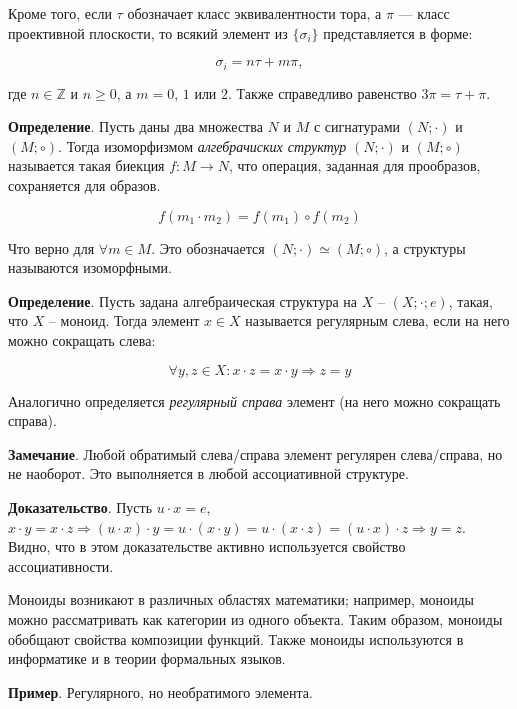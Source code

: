 \documentclass[a4paper]{book}
\begin{document}
Кроме того, если $\tau$ обозначает класс эквивалентности тора, а $\pi$ — класс проективной плоскости, то всякий элемент из $\{\sigma_i\}$ представляется в форме: 

\begin{equation}
	\sigma_i = n\tau + m\pi,
\end{equation}

где $n\in \mathbb{Z}$ и $n\geq 0$, а $m =0$, $1$ или $2$. Также справедливо равенство $3\pi = \tau + \pi$. 


\textbf{Определение}. Пусть даны два множества $N$ и $M$ с сигнатурами $(N;\cdot)$ и $(M;\circ)$. Тогда изоморфизмом \textit{алгебрачиских структур} $(N;\cdot)$ и $(M;\circ)$ называется такая биекция $f:M\rightarrow N$, что операция, заданная для прообразов, сохраняется для образов. 


\begin{equation}
	f(m_1\cdot m_2) = f(m_1)\circ f(m_2)
\end{equation}

Что верно для $\forall m\in M$. Это обозначается $(N;\cdot)\simeq(M;\circ)$, а структуры называются изоморфными.

\textbf{Определение}. Пусть задана алгебраическая структура на $X$ -- $(X;\cdot;e)$, такая, что $X$ -- моноид. Тогда элемент $x\in X$ называется регулярным слева, если на него можно сокращать слева:

\begin{equation}
\forall y,z\in X: x\cdot z = x\cdot y \Rightarrow z = y
\end{equation} 

Аналогично определяется \textit{регулярный справа} элемент (на него можно сокращать справа). 

\textbf{Замечание}. Любой обратимый слева/справа элемент регулярен слева/справа, но не наоборот. Это выполняется в любой ассоциативной структуре. 

\textbf{Доказательство}. Пусть $u\cdot x = e$, $x\cdot y = x\cdot z\Rightarrow (u\cdot x)\cdot y = u \cdot (x\cdot y) = u\cdot (x\cdot z) = (u\cdot x) \cdot z \Rightarrow y = z$. Видно, что в этом доказательстве активно используется свойство ассоциативности. 


Моноиды возникают в различных областях математики; например, моноиды можно рассматривать как категории из одного объекта. Таким образом, моноиды обобщают свойства композиции функций. Также моноиды используются в информатике и в теории формальных языков.

\textbf{Пример}. Регулярного, но необратимого элемента. 
\end{document}

